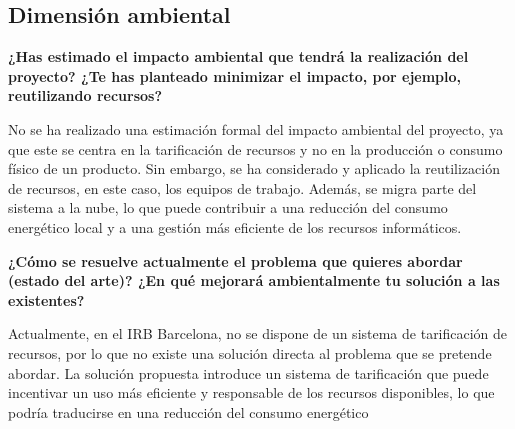 \subsection{Dimensión ambiental}

\textbf{¿Has estimado el impacto ambiental que tendrá la realización del proyecto? 
¿Te has planteado minimizar el impacto, por ejemplo, reutilizando recursos?}

No se ha realizado una estimación formal del impacto ambiental del proyecto, ya que
este se centra en la tarificación de recursos y no en la producción o consumo físico de un producto.
Sin embargo, se ha considerado y aplicado la reutilización de recursos, en este caso, los equipos
de trabajo. Además, se migra parte del sistema a la nube, lo que puede contribuir a una
reducción del consumo energético local y a una gestión más eficiente de los recursos informáticos.

\textbf{¿Cómo se resuelve actualmente el problema que quieres abordar (estado del arte)? 
¿En qué mejorará ambientalmente tu solución a las existentes?}

Actualmente, en el IRB Barcelona, no se dispone de un sistema de tarificación de recursos, por 
lo que no existe una solución directa al problema que se pretende abordar. La solución propuesta
introduce un sistema de tarificación que puede incentivar un uso más eficiente y responsable
de los recursos disponibles, lo que podría traducirse en una reducción del consumo energético